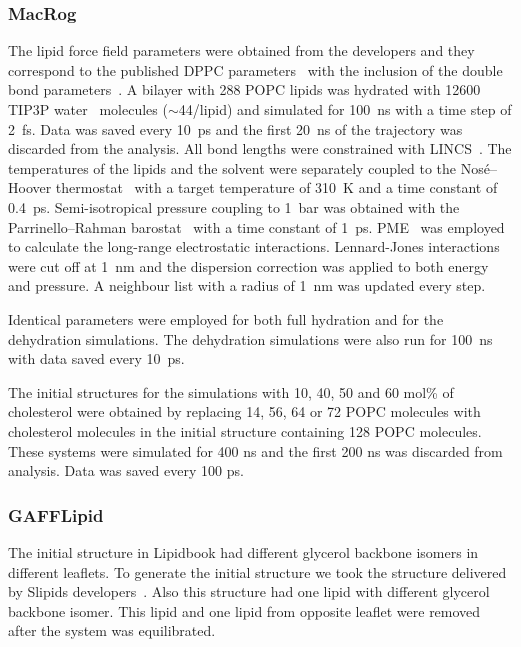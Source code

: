\documentclass[journal=jacsat,manuscript=article]{achemso}
\begin{document}
\subsubsection{MacRog}
The lipid force field parameters were obtained from the developers and they correspond to the published DPPC parameters~\cite{maciejewski14} with the inclusion of the 
double bond parameters~\cite{kulig15}. 
A bilayer with 288 POPC lipids was hydrated with 12600 TIP3P water~\cite{jorgensen83} molecules ($\sim$44/lipid) and simulated for 100~ns with a time step of 2~fs. Data was saved 
every 10~ps and the first 20~ns of the trajectory was discarded from the analysis. 
All bond lengths were constrained with LINCS~\cite{hess97,hess07}. The temperatures of the lipids and the solvent were separately coupled to the Nos\'{e}--Hoover thermostat~\cite{nose84,hoover85} 
with a target temperature of 310~K and a time constant of 0.4~ps. Semi-isotropical pressure coupling to 1~bar was obtained with the Parrinello--Rahman 
barostat~\cite{parrinello81} with a time constant of 1~ps. PME~\cite{darden93,essman95} was employed to calculate the long-range electrostatic interactions. Lennard-Jones interactions were cut off 
at 1~nm and the dispersion correction was applied to both energy and pressure. A neighbour list with a radius of 1~nm was updated every step. 

Identical parameters were employed for both full hydration and for the dehydration simulations. The dehydration simulations were also run for 100~ns 
with data saved every 10~ps.

The initial structures for the simulations with 10, 40, 50 and 60 mol\% of cholesterol were obtained by replacing 14, 56, 64 or 72 POPC molecules 
with cholesterol molecules in the initial structure containing 128 POPC molecules. These systems were simulated for 400 ns and the first 200 ns was 
discarded from analysis. Data was saved every 100 ps.



\subsubsection{GAFFLipid}
The initial structure in Lipidbook \cite{domanski10} had different glycerol backbone isomers in different leaflets. 
To generate the initial structure we took the structure delivered by Slipids developers~\cite{jambeck12b}. Also this structure
had one lipid with different glycerol backbone isomer. This lipid and one lipid from opposite leaflet were removed
after the system was equilibrated.
\end{document}
